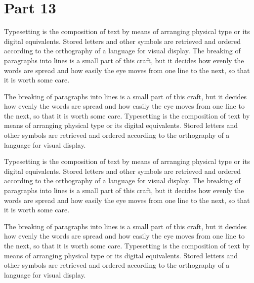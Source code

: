 \documentclass[parskip=half]{scrartcl}
\begin{document}
\section{Part 13}
Typesetting is the composition of text by means of arranging physical type or its digital equivalents. Stored letters and other symbols are retrieved and ordered according to the orthography of a language for visual display. The breaking of paragraphs into lines is a small part of this craft, but it decides how evenly the words are spread and how easily the eye moves from one line to the next, so that it is worth some care.

The breaking of paragraphs into lines is a small part of this craft, but it decides how evenly the words are spread and how easily the eye moves from one line to the next, so that it is worth some care. Typesetting is the composition of text by means of arranging physical type or its digital equivalents. Stored letters and other symbols are retrieved and ordered according to the orthography of a language for visual display.

Typesetting is the composition of text by means of arranging physical type or its digital equivalents. Stored letters and other symbols are retrieved and ordered according to the orthography of a language for visual display. The breaking of paragraphs into lines is a small part of this craft, but it decides how evenly the words are spread and how easily the eye moves from one line to the next, so that it is worth some care.

The breaking of paragraphs into lines is a small part of this craft, but it decides how evenly the words are spread and how easily the eye moves from one line to the next, so that it is worth some care. Typesetting is the composition of text by means of arranging physical type or its digital equivalents. Stored letters and other symbols are retrieved and ordered according to the orthography of a language for visual display.
\end{document}
